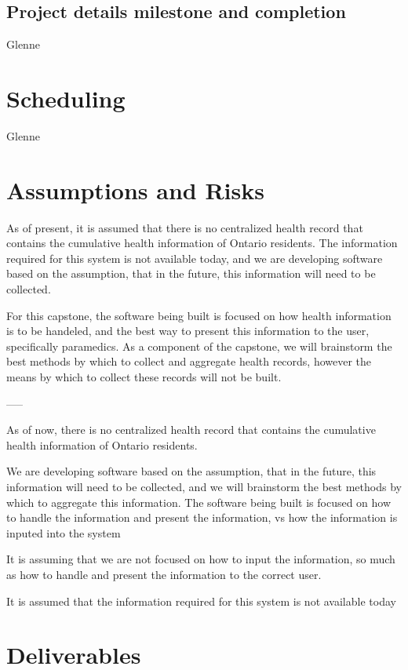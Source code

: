 \documentclass{article}
\begin{document}
\subsection{Project details milestone and completion}
Glenne
\section{Scheduling}
Glenne
\section{Assumptions and Risks}

As of present, it is assumed that there is no centralized health record that contains the cumulative health information of Ontario residents. The information required for this system is not available today, and we are developing software based on the assumption, that in the future, this information will need to be collected.

For this capstone, the software being built is focused on how health information is to be handeled, and the best way to present this information to the user, specifically paramedics. As a component of the capstone, we will brainstorm the best methods by which to collect and aggregate health records, however the means by which to collect these records will not be built.



-----

As of now, there is no centralized health record that contains the cumulative health information of Ontario residents.

We are developing software based on the assumption, that in the future, this information will need to be collected, and we will brainstorm the best methods by which to aggregate this information. The software being built is focused on how to handle the information and present the information, vs how the information is inputed into the system

It is assuming that we are not focused on how to input the information, so much as how to handle and present the information to the correct user.

It is assumed that the information required for this system is not available today

\section{Deliverables}
\end{document}
